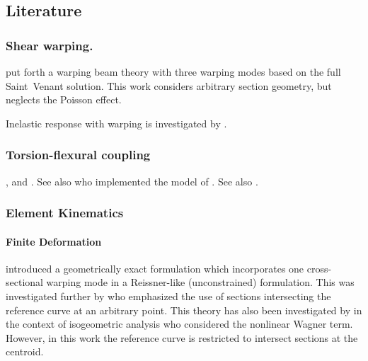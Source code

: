 \subsection{Literature}


\subsubsection{Shear warping.}


\cite{brown1994nonuniform}


\cite{elfatmi2007nonuniform} put forth a warping beam theory with three warping modes based on the full Saint~Venant solution. 
This work considers  arbitrary section geometry, but neglects the Poisson effect.


Inelastic response with warping is investigated by \cite{neal1961effecta,neal1961effect}.

\subsubsection{Torsion-flexural coupling}
\cite{kim2005exact,elfatmi2007nonuniform}, and \cite{du2020threedimensional}. 
See also \cite{lewinski2021incorporating} who implemented the model of \cite{elfatmi2007nonuniform}.
See also \cite{ladeveze1998new}.


\subsubsection{Element Kinematics}
\paragraph{Finite Deformation}
\cite{simo1991geometricallyexact} introduced a geometrically exact formulation which incorporates one cross-sectional warping mode in a Reissner-like (unconstrained) formulation. 
This was investigated further by \cite{gruttmann2000theory} who emphasized the use of sections intersecting the reference curve at an arbitrary point. 
This theory has also been investigated by \cite{rong2020geometrically} in the context of isogeometric analysis who considered the nonlinear Wagner term. 
However, in this work the reference curve is restricted to intersect sections at the centroid. 


